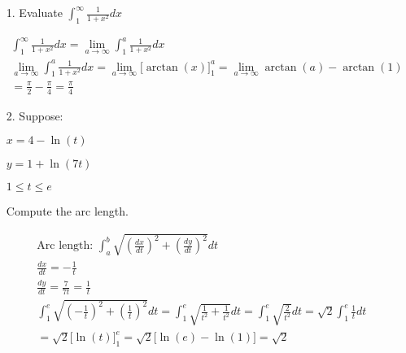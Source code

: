     \begin{itemize}
        \item [1.] Evaluate $\int_{1}^{\infty} \frac{1}{1+x^{2}}dx$
        \\
        \begin{mdframed}
            \begin{equation*}
                \begin{gathered}
                    \int_{1}^{\infty} \frac{1}{1+x^{2}}dx =
                    \lim_{a \to \infty} \int_{1}^{a} \frac{1}{1+x^{2}}dx    \\
                    \lim_{a \to \infty} \int_{1}^{a} \frac{1}{1+x^{2}}dx =
                    \lim_{a \to \infty} \Big[\arctan(x)\Big]_{1}^{a} =
                    \lim_{a \to \infty} \arctan(a) - \arctan(1)             \\
                    = \frac{\pi}{2} - \frac{\pi}{4} = \boxed{\frac{\pi}{4}}
                \end{gathered}
            \end{equation*}
        \end{mdframed}
        
        \item [2.] Suppose:
        
        $x=4-\ln(t)$

        $y=1+\ln(7t)$

        $1 \leq t \leq e$

        Compute the arc length.
        \\
        \begin{mdframed}
            \begin{equation*}
                \begin{gathered}
                    \text{Arc length: } \int_{a}^{b}\sqrt{\left(\frac{dx}{dt}\right)^{2} + \left(\frac{dy}{dt}\right)^{2}}dt    \\
                    \frac{dx}{dt} = -\frac{1}{t}                \\
                    \frac{dy}{dt} = \frac{7}{7t} = \frac{1}{t} \\
                    \int_{1}^{e}\sqrt{\left(-\frac{1}{t}\right)^{2} + \left(\frac{1}{t}\right)^{2}}dt =
                    \int_{1}^{e}\sqrt{\frac{1}{t^{2}} + \frac{1}{t^{2}}}dt =
                    \int_{1}^{e}\sqrt{\frac{2}{t^{2}}}dt =
                    \sqrt{2}\int_{1}^{e}\frac{1}{t}dt           \\
                    = \sqrt{2}\Big[\ln(t)\Big]_{1}^{e} =
                    \sqrt{2}\Big[\ln(e) - \ln(1)\Big] =
                    \boxed{\sqrt{2}}
                \end{gathered}
            \end{equation*}
        \end{mdframed}


\end{itemize}
